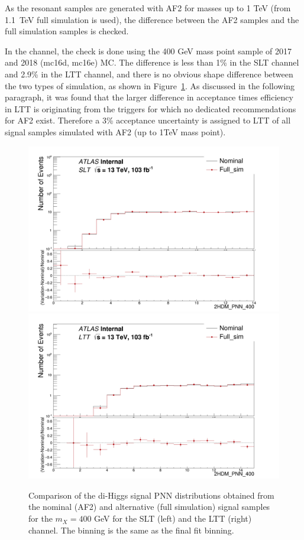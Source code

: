 As the resonant samples are generated with AF2 for masses up to 1 TeV (from \SI{1.1}{\TeV}
full simulation is used), the difference between the AF2 samples and
the full simulation samples is checked.  

In the \lephad channel, the
check is done using the 400 GeV mass point sample of 2017 and 2018
(mc16d, mc16e) MC.  The difference is less than 1\% in the SLT channel
and 2.9\% in the LTT channel, and there is no obvious shape
difference between the two types of simulation, as shown in
Figure~\ref{fig:Lephad_resonant_AF2_VS_FS}. 
As discussed in the following paragraph, it was found that the larger difference in acceptance times efficiency in 
LTT is originating from the \tauhad 
triggers for which no dedicated recommendations for AF2 exist.
Therefore a 3\% acceptance uncertainty is assigned to LTT of all signal
samples simulated with AF2 (up to 1TeV mass point).

\begin{figure}
  \centering
  \includegraphics[width=.49\textwidth]{figures/lephad_modelling_systs/SLT/signal_AF2_check/limit_binning_2HDM_PNN_400_Norm.png}
  \includegraphics[width=.49\textwidth]{figures/lephad_modelling_systs/LTT/signal_AF2_check/limit_binning_2HDM_PNN_400_Norm.png}
  \caption{Comparison of the di-Higgs \lephad signal PNN distributions obtained from the nominal (AF2)
    and alternative (full simulation) signal samples for the  $m_X= 400$ GeV for the
    SLT (left) and the LTT (right) channel. The binning is the same as the final fit binning.
  }
  \label{fig:Lephad_resonant_AF2_VS_FS}
\end{figure}

